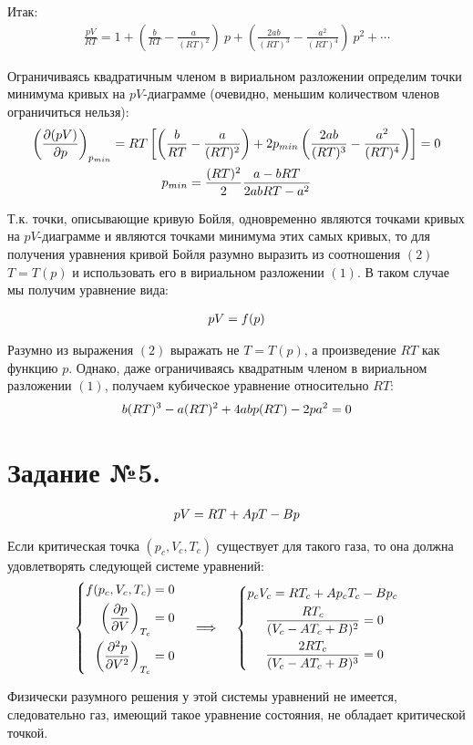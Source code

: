 \documentclass[a4paper]{article}
\begin{document}
Итак:
\begin{gather}
\frac{pV}{RT} = 1 + \left( \frac{b}{RT} - \frac{a}{(RT)^2} \right) \ p + \left( \frac{2ab}{(RT)^3} - \frac{a^2}{(RT)^4} \right) \ p^2 + \cdots
\end{gather}

Ограничиваясь квадратичным членом в вириальном разложении определим точки минимума кривых на $pV$-диаграмме (очевидно, меньшим количеством членов ограничиться нельзя):
\begin{gather}
\left( \frac{\partial (pV)}{\partial p} \right)_{p_{min}} = RT \left[ \left( \frac{b}{RT} - \frac{a}{(RT)^2} \right) + 2 p_{min} \left( \frac{2ab}{(RT)^3} - \frac{a^2}{(RT)^4} \right) \right] = 0 \notag \\
p_{min} = \frac{(RT)^2}{2} \frac{a - bRT}{2abRT - a^2}
\end{gather}

Т.к. точки, описывающие кривую Бойля, одновременно являются точками кривых на $pV$-диаграмме и являются точками минимума этих самых кривых, то для получения уравнения кривой Бойля разумно выразить из соотношения $(2)$ $T = T(p)$ и использовать его в вириальном разложении $(1)$. В таком случае мы получим уравнение вида:

\begin{gather}
pV = f(p) \notag
\end{gather}

Разумно из выражения $(2)$ выражать не $T = T(p)$, а произведение $RT$ как функцию $p$. Однако, даже ограничиваясь квадратным членом в вириальном разложении $(1)$, получаем кубическое уравнение относительно $RT$:
\begin{gather}
b(RT)^3 - a(RT)^2 + 4abp(RT) - 2pa^2 = 0 \notag
\end{gather}

\section{Задание №5.}
\begin{gather}
pV = RT + ApT - Bp \notag
\end{gather}

Если критическая точка $(p_c, V_c, T_c)$ существует для такого газа, то она должна удовлетворять следующей системе уравнений:
\begin{gather}
\left\{
\begin{aligned}
f(p_c, V_c, T_c) = 0 \\
\left( \frac{\partial p}{\partial V} \right)_{T_c} = 0 \\
\left( \frac{\partial^2 p}{\partial V^2} \right)_{T_c} = 0
\end{aligned}
\right. 
\quad 
\implies
\quad 
\left\{
\begin{aligned}
p_c V_c = RT_c + A p_c T_c &- B p_c \\
\frac{RT_c}{(V_c - AT_c + B)^2} &= 0 \\
\frac{2RT_c}{(V_c - AT_c + B)^3} &= 0
\end{aligned}
\right.
\notag
\end{gather}

Физически разумного решения у этой системы уравнений не имеется, следовательно газ, имеющий такое уравнение состояния, не обладает критической точкой.
\end{document}
